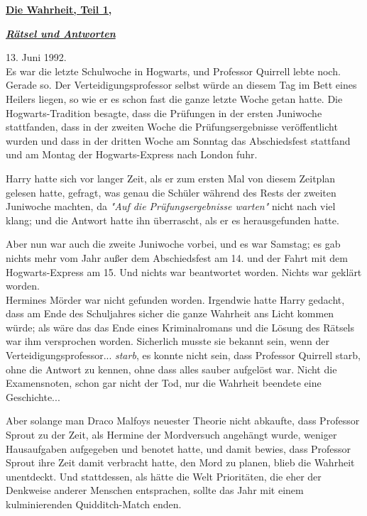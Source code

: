 

\hypertarget{die-wahrheit-teil-1}{%

\textbf{\uline{Die Wahrheit, Teil 1,}}

\hfill\break

\textbf{\emph{\uline{Rätsel und Antworten}}}

13. Juni 1992.\\ Es war die letzte Schulwoche in Hogwarts, und Professor Quirrell lebte noch. Gerade so. Der Verteidigungsprofessor selbst würde an diesem Tag im Bett eines Heilers liegen, so wie er es schon fast die ganze letzte Woche getan hatte. Die Hogwarts-Tradition besagte, dass die Prüfungen in der ersten Juniwoche stattfanden, dass in der zweiten Woche die Prüfungsergebnisse veröffentlicht wurden und dass in der dritten Woche am Sonntag das Abschiedsfest stattfand und am Montag der Hogwarts-Express nach London fuhr.

Harry hatte sich vor langer Zeit, als er zum ersten Mal von diesem Zeitplan gelesen hatte, gefragt, was genau die Schüler während des Rests der zweiten Juniwoche machten, da \emph{"Auf die Prüfungsergebnisse warten"} nicht nach viel klang; und die Antwort hatte ihn überrascht, als er es herausgefunden hatte.

Aber nun war auch die zweite Juniwoche vorbei, und es war Samstag; es gab nichts mehr vom Jahr außer dem Abschiedsfest am 14. und der Fahrt mit dem Hogwarts-Express am 15. Und nichts war beantwortet worden. Nichts war geklärt worden.\\ Hermines Mörder war nicht gefunden worden. Irgendwie hatte Harry gedacht, dass am Ende des Schuljahres sicher die ganze Wahrheit ans Licht kommen würde; als wäre das das Ende eines Kriminalromans und die Lösung des Rätsels war ihm versprochen worden. Sicherlich musste sie bekannt sein, wenn der Verteidigungsprofessor... \emph{starb}, es konnte nicht sein, dass Professor Quirrell starb, ohne die Antwort zu kennen, ohne dass alles sauber aufgelöst war. Nicht die Examensnoten, schon gar nicht der Tod, nur die Wahrheit beendete eine Geschichte...

Aber solange man Draco Malfoys neuester Theorie nicht abkaufte, dass Professor Sprout zu der Zeit, als Hermine der Mordversuch angehängt wurde, weniger Hausaufgaben aufgegeben und benotet hatte, und damit bewies, dass Professor Sprout ihre Zeit damit verbracht hatte, den Mord zu planen, blieb die Wahrheit unentdeckt. Und stattdessen, als hätte die Welt Prioritäten, die eher der Denkweise anderer Menschen entsprachen, sollte das Jahr mit einem kulminierenden Quidditch-Match enden.

}
